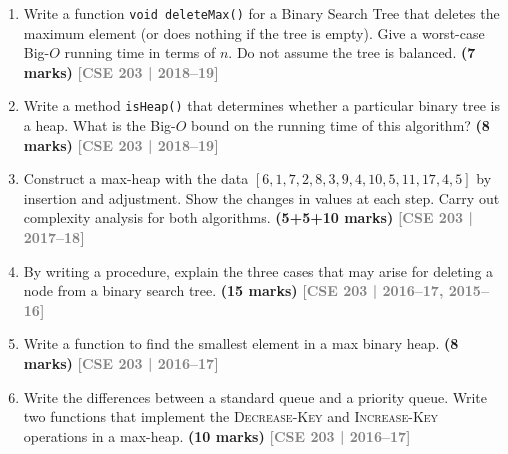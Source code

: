 \documentclass[12pt,a3paper]{article}
\newcommand{\yr}[1]{\hfill\textcolor{gray}{\small\textbf{[#1]}}}
\newcommand{\mk}[1]{\textcolor{orange!70!black}{\small\textbf{(#1 marks)}}}
\begin{document}
\begin{enumerate}
\item Write a function \texttt{void deleteMax()} for a Binary Search Tree that deletes the maximum element (or does nothing if the tree is empty). Give a worst-case Big-$O$ running time in terms of $n$. Do not assume the tree is balanced. \mk{7}
\yr{CSE 203 | 2018--19}

\item Write a method \texttt{isHeap()} that determines whether a particular binary tree is a heap. What is the Big-$O$ bound on the running time of this algorithm? \mk{8}
\yr{CSE 203 | 2018--19}

\item Construct a max-heap with the data $[6, 1, 7, 2, 8, 3, 9, 4, 10, 5, 11, 17, 4, 5]$ by insertion and adjustment. Show the changes in values at each step. Carry out complexity analysis for both algorithms. \mk{5+5+10}
\yr{CSE 203 | 2017--18}


\item By writing a procedure, explain the three cases that may arise for deleting a node from a binary search tree. \mk{15}
\yr{CSE 203 | 2016--17, 2015--16}

\item Write a function to find the smallest element in a max binary heap. \mk{8}
\yr{CSE 203 | 2016--17}

\item Write the differences between a standard queue and a priority queue. Write two functions that implement the \textsc{Decrease-Key} and \textsc{Increase-Key} operations in a max-heap. \mk{10}
\yr{CSE 203 | 2016--17}


\end{enumerate}
\end{document}
